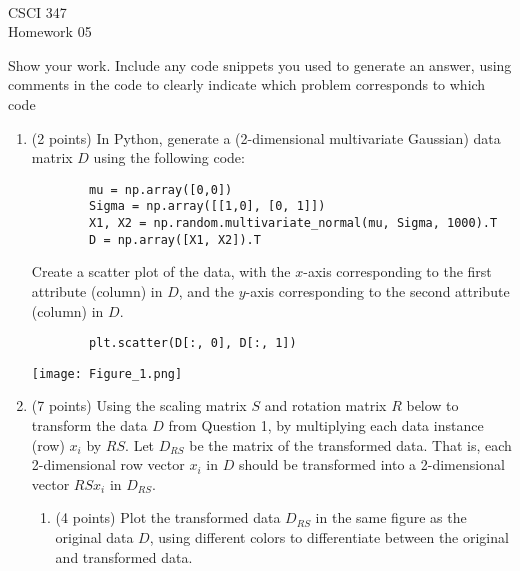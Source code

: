 \documentclass[11pt]{article}
\newcommand{\course}{CSCI 347}
\newcommand{\proj}{Homework 05}
\begin{document}
{ ~\\
    \course \\ 
    \proj \\ 
}

Show your work. Include any code snippets you used to generate an answer, using
comments in the code to clearly indicate which problem corresponds to which code

\begin{enumerate}

    \item (2 points) In Python, generate a (2-dimensional multivariate Gaussian)
    data matrix $D$ using the following code:

    \begin{verbatim}
        mu = np.array([0,0])
        Sigma = np.array([[1,0], [0, 1]])
        X1, X2 = np.random.multivariate_normal(mu, Sigma, 1000).T
        D = np.array([X1, X2]).T
    \end{verbatim} 

    Create a scatter plot of the data, with the $x$-axis corresponding to the
    first attribute (column) in $D$, and the $y$-axis corresponding to the
    second attribute (column) in $D$.
    \begin{verbatim}
        plt.scatter(D[:, 0], D[:, 1])
    \end{verbatim}
    \texttt{[image: Figure\_1.png]}

    \item (7 points) Using the scaling matrix $S$ and rotation matrix $R$ below
    to transform the data $D$ from Question 1, by multiplying each data instance
    (row) $x_i$ by $RS$. Let $D_{RS}$ be the matrix of
    the transformed data. That is, each 2-dimensional row vector $x_i$
    in $D$ should be transformed into a 2-dimensional vector $RSx_i$ in $D_{RS}$.

    \begin{enumerate}

        \item (4 points) Plot the transformed data $D_{RS}$ in the same figure
        as the original data $D$, using different colors to differentiate
        between the original and transformed data.


\end{enumerate}
\end{enumerate}
\end{document}
